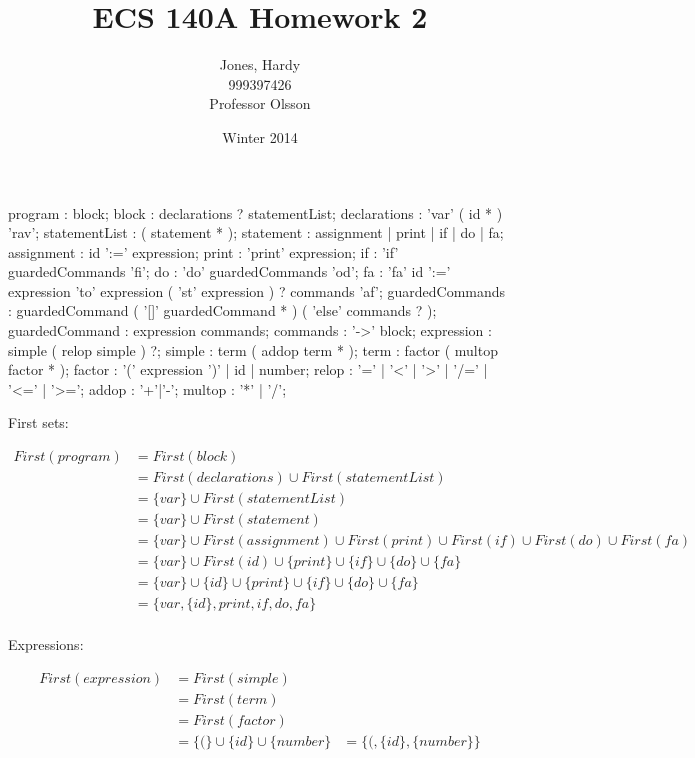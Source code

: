 \documentclass[12pt,letterpaper]{article}
\title{ECS 140A Homework 2\vspace{-2ex}}
\author{Jones, Hardy\\
        999397426\\
        Professor Olsson\vspace{-2ex}}
\date{Winter 2014}
\begin{document}
  \maketitle

  \begin{rail}
    program : block;
    block : declarations ? statementList;
    declarations : 'var' ( id * ) 'rav';
    statementList : ( statement * );
    statement : assignment | print | if | do | fa;
    assignment : id ':=' expression;
    print : 'print' expression;
    if : 'if' guardedCommands 'fi';
    do : 'do' guardedCommands 'od';
    fa : 'fa' id ':=' expression 'to' expression ( 'st' expression ) ? commands 'af';
    guardedCommands : guardedCommand ( '[]' guardedCommand * ) ( 'else' commands ? );
    guardedCommand : expression commands;
    commands : '->' block;
    expression : simple ( relop simple ) ?;
    simple : term ( addop term * );
    term : factor ( multop factor * );
    factor : '(' expression ')' | id | number;
    relop : '=' | '<' | '>' | '/=' | '<=' | '>=';
    addop : '+'|'-';
    multop : '*' | '/';
  \end{rail}


  First sets:

  \begin{align*}
    First(program) &= First(block) \\
    &= First(declarations) \cup First(statementList) \\
    &= \{ var \} \cup First(statementList) \\
    &= \{ var \} \cup First(statement) \\
    &= \{ var \} \cup First(assignment) \cup First(print) \cup First(if) \cup First(do) \cup First(fa)\\
    &= \{ var \} \cup First(id) \cup \{ print \} \cup \{ if \} \cup \{ do \} \cup \{ fa \}\\
    &= \{ var \} \cup \{ id \} \cup \{ print \} \cup \{ if \} \cup \{ do \} \cup \{ fa \}\\
    &= \{ var, \{ id \}, print, if, do, fa \}\\
  \end{align*}

  Expressions:

  \begin{align*}
    First(expression) &= First(simple) \\
    &= First(term) \\
    &= First(factor) \\
    &= \{ ( \} \cup \{ id \} \cup \{ number \}
    &= \{ (, \{ id \}, \{ number \} \}
  \end{align*}
\end{document}
